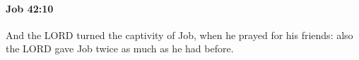 
		\paragraph{Job 42:10} %
			\label{JOB-42-10}

			And the LORD turned the captivity of Job, when he prayed for his friends: also the LORD gave Job twice as much as he had before.


